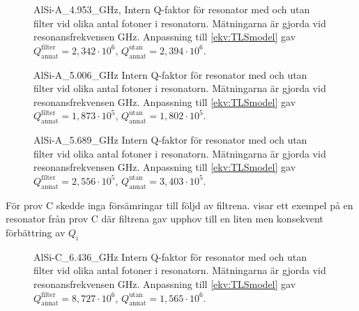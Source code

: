 \documentclass[main.tex]{subfiles}
\begin{document}
\iffalse
\begin{figure}[H]
  \centering
  \setlength{}
  \setlength\figureheight{15em}
  
  \caption{AlSi-A\_4.953\_GHz, Intern Q-faktor för resonator med och utan filter vid olika antal fotoner i resonatorn. Mätningarna är gjorda vid resonansfrekvensen \unit[4,953]{GHz}. Anpassning till \ref{ekv:TLSmodel} gav $Q_{\text{annat}}^{\text{filter}}=2,342\cdot10^6$, $Q_{\text{annat}}^{\text{utan}}=2,394\cdot10^6$.} 
  \label{fig:A4.953}
\end{figure}

\begin{figure}[H]
  \centering
  \setlength{}
  \setlength\figureheight{15em}
  
  \caption{AlSi-A\_5.006\_GHz Intern Q-faktor för resonator med och utan filter vid olika antal fotoner i resonatorn. Mätningarna är gjorda vid resonansfrekvensen \unit[4,953]{GHz}. Anpassning till \ref{ekv:TLSmodel} gav $Q_{\text{annat}}^{\text{filter}}=1,873\cdot10^5$, $Q_{\text{annat}}^{\text{utan}}=1,802\cdot10^5$.}
  \label{fig:A5.006}
\end{figure}

\begin{figure}[H]
  \centering
  \setlength{}
  \setlength\figureheight{15em}
  
  \caption{AlSi-A\_5.689\_GHz Intern Q-faktor för resonator med och utan filter vid olika antal fotoner i resonatorn. Mätningarna är gjorda vid resonansfrekvensen \unit[4,953]{GHz}. Anpassning till \ref{ekv:TLSmodel} gav  $Q_{\text{annat}}^{\text{filter}}=2,556\cdot10^5$, $Q_{\text{annat}}^{\text{utan}}=3,403\cdot10^5$.}
  \label{fig:A5.689}
\end{figure}


För prov C skedde inga försämringar till följd av filtrena.  visar ett exempel på en resonator från prov C där filtrena gav upphov till en liten men konsekvent förbättring av $Q_i$

\begin{figure}[H]
  \centering
  \setlength{}
  \setlength\figureheight{15em}
  
  \caption{AlSi-C\_6.436\_GHz Intern Q-faktor för resonator med och utan filter vid olika antal fotoner i resonatorn. Mätningarna är gjorda vid resonansfrekvensen \unit[4,953]{GHz}. Anpassning till \ref{ekv:TLSmodel} gav $Q_{\text{annat}}^{\text{filter}}=8,727\cdot10^6$, $Q_{\text{annat}}^{\text{utan}}=1,565\cdot10^6$.}
  \label{fig:C6.436}
\end{figure}
\end{document}
